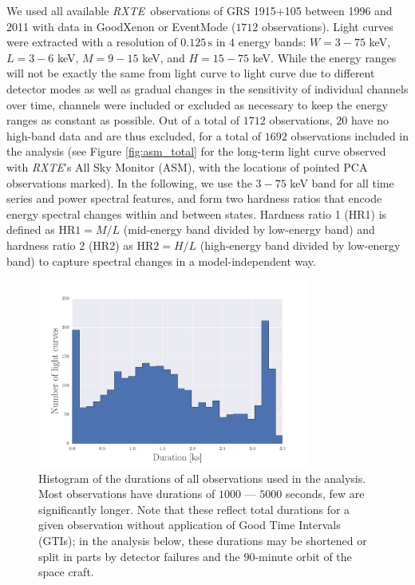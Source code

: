 \documentclass[fleqn,usenatbib]{mnras}
\newcommand{\project}[1]{\textsl{#1}}
\newcommand{\rxte}{\project{RXTE}}
\begin{document}
We used all available \rxte\ observations of GRS 1915+105 between 1996 and 2011 with data in GoodXenon or EventMode ($1712$ observations). Light curves were extracted with a resolution of $0.125\,\mathrm{s}$ in $4$ energy bands: $W = 3 - 75$ keV, $L = 3 - 6$ keV, $M = 9 - 15$ keV, and $H = 15 - 75$ keV. While the energy ranges will not be exactly the same from light curve to light curve due to different detector modes as well as gradual changes in the sensitivity of individual channels over time, channels were included or excluded as necessary to keep the energy ranges as constant as possible. Out of a total of $1712$ observations, $20$ have no high-band data and are thus excluded, for a total of $1692$ observations included in the analysis (see Figure \ref{fig:asm_total} for the long-term light curve observed with \rxte's All Sky Monitor (ASM), with the locations of pointed PCA observations marked). 
In the following, we use the $3 - 75$ keV band for all time series and power spectral features, and form two hardness ratios that encode energy spectral changes within and between states. Hardness ratio 1 (HR1) is defined as $\mathrm{HR}1 = M/L$ (mid-energy band divided by low-energy band) and hardness ratio 2 (HR2) as $\mathrm{HR}2 = H/L$ (high-energy band divided by low-energy band) to capture spectral changes in a model-independent way.




\begin{figure}
\begin{center}
\includegraphics[width=9cm]{grs1915_durations.pdf}
\caption{Histogram of the durations of all observations used in the analysis. Most observations have durations of $1000$ --- $5000$ seconds, few are significantly longer. Note that these reflect total durations for a given observation without application of Good Time Intervals (GTIs); in the analysis below, these durations may be shortened or split in parts by detector failures and the $90$-minute orbit of the space craft.}
\label{fig:obsdurations}
\end{center}
\end{figure}
\end{document}
